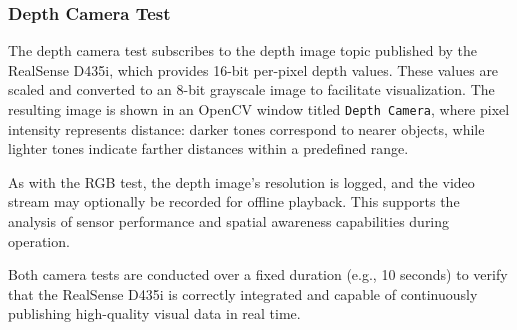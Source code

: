 \documentclass{CSSRforAfrica}
\begin{document}
\subsubsection*{Depth Camera Test}

The depth camera test subscribes to the depth image topic published by the RealSense D435i, which provides 16-bit per-pixel depth values. These values are scaled and converted to an 8-bit grayscale image to facilitate visualization. The resulting image is shown in an OpenCV window titled \texttt{Depth Camera}, where pixel intensity represents distance: darker tones correspond to nearer objects, while lighter tones indicate farther distances within a predefined range.

As with the RGB test, the depth image’s resolution is logged, and the video stream may optionally be recorded for offline playback. This supports the analysis of sensor performance and spatial awareness capabilities during operation.

\vspace{0.5em}

Both camera tests are conducted over a fixed duration (e.g., 10 seconds) to verify that the RealSense D435i is correctly integrated and capable of continuously publishing high-quality visual data in real time.
\end{document}
